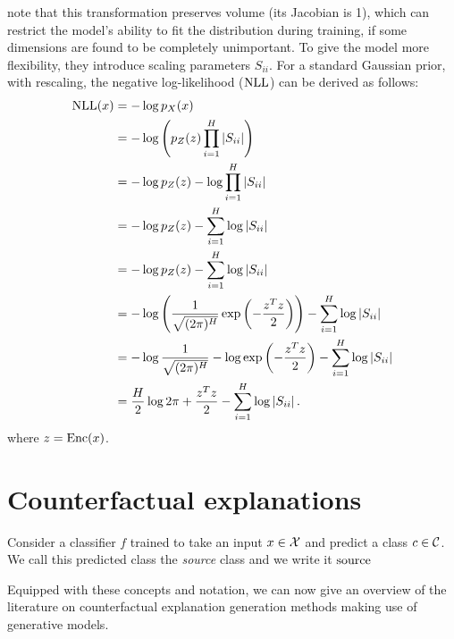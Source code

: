 \documentclass[../main.tex]{subfiles}
\begin{document}
\citeauthor{dinhNICE2015} note that this transformation preserves volume (its Jacobian is 1), which can restrict the model's ability to fit the distribution during training, \eg{} if some dimensions are found to be completely unimportant.
To give the model more flexibility, they introduce scaling parameters $S_{ii}$.
For a standard Gaussian prior, with rescaling, the negative log-likelihood ($\text{NLL}$) can be derived as follows:
\begin{align*}
    \text{NLL}(x)
     & = - \log p_X(x)                                                                               \\
     & = - \log \left( p_Z(z) \prod_{i=1}^H \left\lvert S_{ii}\right\rvert \right)                            \\
     & = - \log p_Z(z) - \log \prod_{i=1}^H \left\lvert S_{ii}\right\rvert                                    \\
     & = - \log p_Z(z) - \sum_{i=1}^H \log \left\lvert S_{ii}\right\rvert                                     \\
     & = - \log p_Z(z) - \sum_{i=1}^H \log \left\lvert S_{ii}\right\rvert                                     \\
     & = - \log \left( \frac{1}{\sqrt{(2 \pi)^H}} \exp\left(- \frac{z^T z}{2}\right)\right)
    - \sum_{i=1}^H \log \left\lvert S_{ii}\right\rvert                                                        \\
     & = - \log \frac{1}{\sqrt{(2 \pi)^H}}
    - \log \exp\left(- \frac{z^T z}{2}\right)
    - \sum_{i=1}^H \log \left\lvert S_{ii}\right\rvert                                                        \\
     & = \frac{H}{2} \log 2 \pi
    +  \frac{z^T z}{2}
    - \sum_{i=1}^H \log \left\lvert S_{ii}\right\rvert.
\end{align*}
where $z = \operatorname{Enc}(x)$.

\section{Counterfactual explanations}

Consider a classifier $f$ trained to take an input $x \in \mathcal{X}$ and predict a class $c \in \mathcal{C}$.
We call this predicted class the \emph{source} class and we write it $\mathrm{source}$

Equipped with these concepts and notation, we can now give an overview of the literature on counterfactual explanation generation methods making use of generative models.
\end{document}
